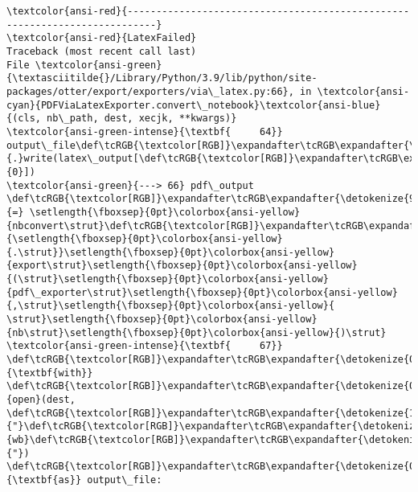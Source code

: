 \documentclass[11pt]{article}
\begin{document}
    \begin{Verbatim}[commandchars=\\\{\}, frame=single, framerule=2mm, rulecolor=\color{outerrorbackground}]
\textcolor{ansi-red}{---------------------------------------------------------------------------}
\textcolor{ansi-red}{LatexFailed}                               Traceback (most recent call last)
File \textcolor{ansi-green}{\textasciitilde{}/Library/Python/3.9/lib/python/site-packages/otter/export/exporters/via\_latex.py:66}, in \textcolor{ansi-cyan}{PDFViaLatexExporter.convert\_notebook}\textcolor{ansi-blue}{(cls, nb\_path, dest, xecjk, **kwargs)}
\textcolor{ansi-green-intense}{\textbf{     64}}         output\_file\def\tcRGB{\textcolor[RGB]}\expandafter\tcRGB\expandafter{\detokenize{98,98,98}}{.}write(latex\_output[\def\tcRGB{\textcolor[RGB]}\expandafter\tcRGB\expandafter{\detokenize{98,98,98}}{0}])
\textcolor{ansi-green}{---> 66} pdf\_output \def\tcRGB{\textcolor[RGB]}\expandafter\tcRGB\expandafter{\detokenize{98,98,98}}{=} \setlength{\fboxsep}{0pt}\colorbox{ansi-yellow}{nbconvert\strut}\def\tcRGB{\textcolor[RGB]}\expandafter\tcRGB\expandafter{\detokenize{98,98,98}}{\setlength{\fboxsep}{0pt}\colorbox{ansi-yellow}{.\strut}}\setlength{\fboxsep}{0pt}\colorbox{ansi-yellow}{export\strut}\setlength{\fboxsep}{0pt}\colorbox{ansi-yellow}{(\strut}\setlength{\fboxsep}{0pt}\colorbox{ansi-yellow}{pdf\_exporter\strut}\setlength{\fboxsep}{0pt}\colorbox{ansi-yellow}{,\strut}\setlength{\fboxsep}{0pt}\colorbox{ansi-yellow}{ \strut}\setlength{\fboxsep}{0pt}\colorbox{ansi-yellow}{nb\strut}\setlength{\fboxsep}{0pt}\colorbox{ansi-yellow}{)\strut}
\textcolor{ansi-green-intense}{\textbf{     67}} \def\tcRGB{\textcolor[RGB]}\expandafter\tcRGB\expandafter{\detokenize{0,135,0}}{\textbf{with}} \def\tcRGB{\textcolor[RGB]}\expandafter\tcRGB\expandafter{\detokenize{0,135,0}}{open}(dest, \def\tcRGB{\textcolor[RGB]}\expandafter\tcRGB\expandafter{\detokenize{175,0,0}}{"}\def\tcRGB{\textcolor[RGB]}\expandafter\tcRGB\expandafter{\detokenize{175,0,0}}{wb}\def\tcRGB{\textcolor[RGB]}\expandafter\tcRGB\expandafter{\detokenize{175,0,0}}{"}) \def\tcRGB{\textcolor[RGB]}\expandafter\tcRGB\expandafter{\detokenize{0,135,0}}{\textbf{as}} output\_file:


\end{Verbatim}
\end{document}
